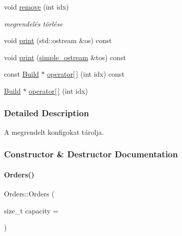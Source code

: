 \begin{DoxyCompactItemize}
void \mbox{\hyperlink{class_orders_a36a43f158466760d315ca23ac24bd4bd}{remove}} (int idx)
\begin{DoxyCompactList}\small\item\em megrendelés törlése \end{DoxyCompactList}\item 
void \mbox{\hyperlink{class_orders_a57fb3a5db65235ac3eb6dee473f7ef34}{print}} (std\+::ostream \&os) const
\item 
void \mbox{\hyperlink{class_orders_a081beda059e45de92599fa48a8668c54}{print}} (\mbox{\hyperlink{structsimple__ostream}{simple\+\_\+ostream}} \&tos) const
\item 
const \mbox{\hyperlink{class_build}{Build}} $\ast$ \mbox{\hyperlink{class_orders_aab4445872bb7f3d952ebc89f6b2bd146}{operator\mbox{[}$\,$\mbox{]}}} (int idx) const
\item 
\mbox{\hyperlink{class_build}{Build}} $\ast$ \mbox{\hyperlink{class_orders_aca77a601a993ef2d5dcfb71b9ee41542}{operator\mbox{[}$\,$\mbox{]}}} (int idx)
\end{DoxyCompactItemize}


\subsubsection{Detailed Description}
A megrendelt konfigokat tárolja. 

\subsubsection{Constructor \& Destructor Documentation}
\mbox{\label{class_orders_aa52a641a269671bbf68637e0771e8b5d}} 
\paragraph{\texorpdfstring{Orders()}{Orders()}}
{\footnotesize\ttfamily Orders\+::\+Orders (\begin{DoxyParamCaption}\item[{size\+\_\+t}]{capacity = {} }\end{DoxyParamCaption})\hspace{0.3cm}{\ttfamily [inline]}}

\mbox{\label{class_orders_a12bcbd0cd430b51f65f651fddad3f662}} 
